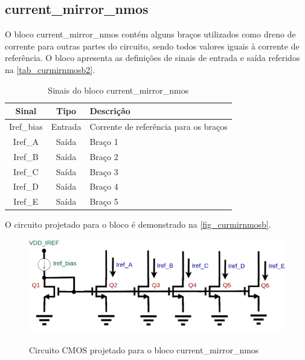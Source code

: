 \renewcommand{\NomeBloco}{current\_mirror\_nmos}
\renewcommand{\NomeBlocoNoUnderline}{curmirnmosb}
\renewcommand{\NomePTab}{tab_\NomeBlocoNoUnderline}
\renewcommand{\NomeSTab}{tab_\NomeBlocoNoUnderline2}
\renewcommand{\NomePFig}{fig_\NomeBlocoNoUnderline}
\renewcommand{\NomeSFig}{fig_\NomeBlocoNoUnderline2}
\renewcommand{\NomeTTab}{tab_\NomeBlocoNoUnderline3}
\renewcommand{\NomeQTab}{tab_\NomeBlocoNoUnderline4}

\subsection{current\_mirror\_nmos}

O bloco \NomeBloco{} cont\'em alguns braços utilizados como dreno de corrente para outras partes do circuito, sendo todos valores iguais \`a corrente de refer\^encia. O bloco apresenta as definições de sinais de entrada e sa\'ida referidos na \autoref{\NomeSTab}.

\begin{table}[htbp]
\caption{Sinais do bloco \NomeBloco}
\label{\NomeSTab}
\centering
\begin{tabular}{ccl}

    \toprule
    Sinal & Tipo    & Descrição        \\
    \midrule \midrule
    Iref\_bias   & Entrada   &  Corrente de refer\^encia para os braços \\
    \midrule
    Iref\_A   & Saída   &  Braço 1 \\
    \midrule
    Iref\_B   & Saída   &  Braço 2 \\
    \midrule
    Iref\_C   & Saída   &  Braço 3 \\
    \midrule
    Iref\_D   & Saída   &  Braço 4 \\
    \midrule
    Iref\_E   & Saída   &  Braço 5 \\
    \bottomrule
\end{tabular}
\end{table}

O circuito projetado para o bloco \'e demonstrado na \autoref{\NomePFig}.

\begin{figure}[htb]
 \centering
    \centering
    \caption{Circuito CMOS projetado para o bloco \NomeBloco} 
    \includegraphics[scale=0.3]{Circuitos/current_mirror.png}
    \label{\NomePFig}
\end{figure}

